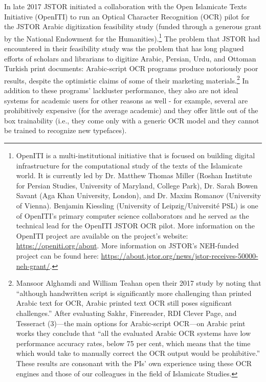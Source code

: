 In late 2017 JSTOR initiated a collaboration with the Open Islamicate Texts
Initiative (OpenITI) to run an Optical Character Recognition (OCR) pilot for
the JSTOR Arabic digitization feasibility study (funded through a generous
grant by the National Endowment for the Humanities).\footnote{OpenITI is a
multi-institutional initiative that is focused on building digital
infrastructure for the computational study of the texts of the Islamicate
world. It is currently led by Dr. Matthew Thomas Miller (Roshan Institute for
Persian Studies, University of Maryland, College Park), Dr. Sarah Bowen Savant
(Aga Khan University, London), and Dr. Maxim Romanov (University of Vienna).
Benjamin Kiessling (University of Leipzig/Université PSL) is one of OpenITI’s
primary computer science collaborators and he served as the technical lead for
the OpenITI JSTOR OCR pilot.  More information on the OpenITI project are
available on the project’s website: \url{https://openiti.org/about}. More
information on JSTOR’s NEH-funded project can be found here:
\url{https://about.jstor.org/news/jstor-receives-50000-neh-grant/}.}
 The problem that JSTOR had encountered in their feasibility study was the
problem that has long plagued efforts of scholars and librarians to digitize
Arabic, Persian, Urdu, and Ottoman Turkish print documents: Arabic-script OCR
programs produce notoriously poor results, despite the optimistic claims of
some of their marketing materials\cite{alghamdi2017experimental}.\footnote{Mansoor
Alghamdi and William Teahan open their 2017 study by noting that “although
handwritten script is significantly more challenging than printed Arabic text
for OCR, Arabic printed text OCR still poses significant challenges.” After
evaluating Sakhr, Finereader, RDI Clever Page, and Tesseract (3)—the main
options for Arabic-script OCR—on Arabic print works they conclude that “all the
evaluated Arabic OCR systems have low performance accuracy rates, below 75 per
cent, which means that the time which would take to manually correct the OCR
output would be prohibitive.” These results are consonant with the PIs’ own
experience using these OCR engines and those of our colleagues in the field of
Islamicate Studies.}
In addition to these programs’ lackluster performance, they also are not ideal
systems for academic users for other reasons as well - for example, several are
prohibitively expensive (for the average academic) and they offer little out of
the box trainability (i.e., they come only with a generic OCR model and they
cannot be trained to recognize new typefaces).

